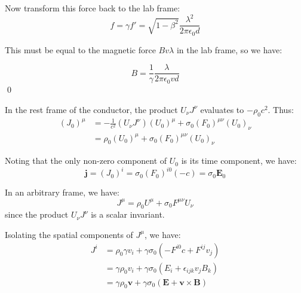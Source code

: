 \documentclass[12pt]{article}
\begin{document}
Now transform this force back to the lab frame:
\begin{equation}
    f = \gamma f' = \sqrt{1 - \beta^{2}} \frac{\lambda^{2}}{2\pi\epsilon_{0}d}
\end{equation}

This must be equal to the magnetic force $Bv\lambda$ in the lab frame, so we have:

\begin{equation}
    B = \frac{1}{\gamma} \frac{\lambda}{2\pi\epsilon_{0}vd}
\end{equation}
\qed



In the rest frame of the conductor, the product $U_{\nu} J^{\nu}$ evaluates to $-\rho_{0} c^{2}$. Thus:
\begin{equation}
    \begin{split}
        (J_{0})^{\mu} &= -\frac{1}{c^{2}} (U_{\nu} J^{\nu}) (U_{0})^{\mu} + \sigma_{0} (F_{0})^{\mu \nu} (U_{0})_{\nu} \\
        &= \rho_{0} (U_{0})^{\mu} + \sigma_{0} (F_{0})^{\mu \nu} (U_{0})_{\nu}
    \end{split}
\end{equation}

Noting that the only non-zero component of $U_{0}$ is its time component, we have:
\begin{equation}
    \mathbf{j} = (J_{0})^{i} = \sigma_{0} (F_{0})^{i0} (-c) = \sigma_{0} \mathbf{E}_{0}
\end{equation}

In an arbitrary frame, we have:
\begin{equation}
    J^{\mu} = \rho_{0} U^{\mu} + \sigma_{0} F^{\mu \nu} U_{\nu}
\end{equation}
since the product $U_{\nu} J^{\nu}$ is a scalar invariant.

Isolating the spatial components of $J^{\mu}$, we have:
\begin{equation}
    \begin{split}
        J^{i} &= \rho_{0} \gamma v_{i} + \gamma \sigma_{0} (-F^{i0}c + F^{ij} v_{j}) \\
        &= \gamma \rho_{0} v_{i} + \gamma \sigma_{0} (E_{i} + \epsilon_{ijk} v_{j} B_{k}) \\
        &= \gamma \rho_{0} \mathbf{v} + \gamma \sigma_{0} (\mathbf{E} + \mathbf{v} \times \mathbf{B})
    \end{split}
\end{equation}
\end{document}
